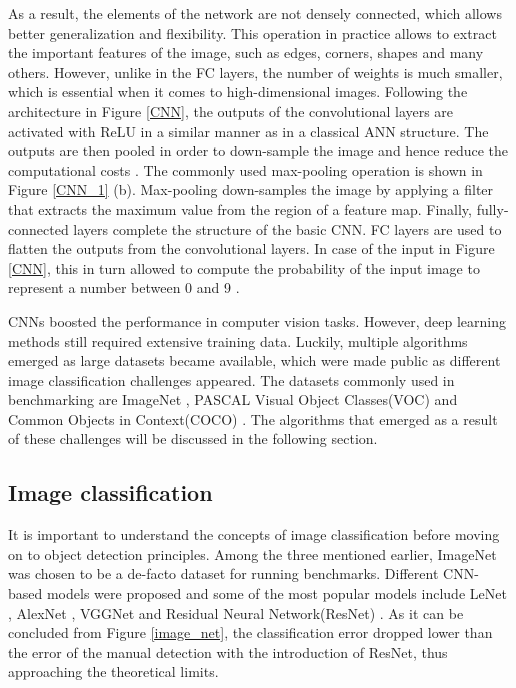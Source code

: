 As a result, the elements of the network  are not densely connected, which allows better generalization and flexibility. This operation in practice allows to extract the important features of the image, such as edges, corners, shapes and many others.  However, unlike in the FC layers, the number of weights is much smaller, which is essential when it comes to high-dimensional images. Following the architecture in Figure \ref{CNN}, the outputs of the convolutional layers are activated with ReLU in a similar manner as in a classical ANN structure. The outputs are then pooled in order to down-sample the image and hence reduce the computational costs \cite{Liu2016}. The commonly used max-pooling operation is shown in Figure \ref{CNN_1} (b). Max-pooling down-samples the image by applying a filter that extracts the maximum value from the region of a feature map. Finally, fully-connected layers complete the structure of the basic CNN. FC layers are used to flatten the outputs from the convolutional layers. In case of the input in Figure \ref{CNN}, this in turn allowed to compute the probability of the input image to represent a number between 0 and 9 \cite{Mahony2019}.

CNNs boosted the performance in computer vision tasks. However, deep learning methods still required extensive training data. Luckily, multiple algorithms emerged as large datasets became available, which were made public as different image classification challenges appeared. The  datasets commonly used in benchmarking are ImageNet \cite{Russakovsky2014}, PASCAL Visual Object Classes(VOC) \cite{Everingham10} and Common Objects in Context(COCO) \cite{Lin2014}. The algorithms that emerged as a result of these challenges will be discussed in the following section. 

\subsection{Image classification}
\label{classification_section} 
It is important to understand the concepts of image classification before moving on to object detection principles. Among the three mentioned earlier, ImageNet was chosen to be a de-facto dataset for running benchmarks.  Different CNN-based models were proposed and some of the most popular models include LeNet \cite{lecun-gradientbased-learning-applied-1998}, AlexNet \cite{NIPS2012_c399862d}, VGGNet \cite{Simonyan2014} and Residual Neural Network(ResNet) \cite{He2015}. As it can be concluded from Figure \ref{image_net}, the classification error dropped lower than the error of the manual detection with the introduction of ResNet, thus approaching the theoretical limits. 

